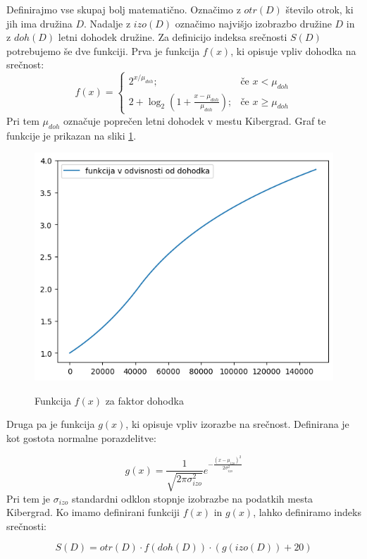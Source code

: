\documentclass{article}
\begin{document}
Definirajmo vse skupaj bolj matematično. Označimo z $otr(D)$ število otrok, ki jih ima družina $D$. Nadalje z $izo(D)$ označimo najvišjo izobrazbo družine $D$ in z $doh(D)$ letni 
dohodek družine. Za definicijo indeksa srečnosti $S(D)$ potrebujemo še dve funkciji. Prva je funkcija $f(x)$, ki opisuje vpliv dohodka na srečnost:
$$
f(x) =
\begin{cases}
    2^{x/\mu_{doh}}; & \text{če } x < \mu_{doh} \\
    2 + \log_2 (1 + \frac{x - \mu_{doh}}{\mu_{doh}}); & \text{če } x \geq \mu_{doh}
\end{cases}
$$ 
Pri tem $\mu_{doh}$ označuje poprečen letni dohodek v mestu Kibergrad. Graf te funkcije je prikazan na sliki \ref{fig:slika3}.

\begin{figure}[H]
    \caption{Funkcija $f(x)$ za faktor dohodka}
    \centering
    \includegraphics[scale=0.8]{funkcija_v_odvisnosti_od_dohodka.png}
    \label{fig:slika3}
\end{figure}

Druga pa je funkcija $g(x)$, ki opisuje vpliv izorazbe na srečnost. Definirana je kot gostota normalne porazdelitve:

$$
g(x) = \frac{1}{\sqrt{2 \pi \sigma_{izo}^2}} e^{-\frac{(x-\mu_{izo})^2}{2 \sigma_{izo}^2}}
$$
Pri tem je $\sigma_{izo}$ standardni odklon stopnje izobrazbe na podatkih mesta Kibergrad. Ko imamo definirani funkciji $f(x)$ in $g(x)$,
lahko definiramo indeks srečnosti:

$$
S(D) = otr(D) \cdot f(doh(D)) \cdot (g(izo(D)) + 20)
$$
\end{document}
